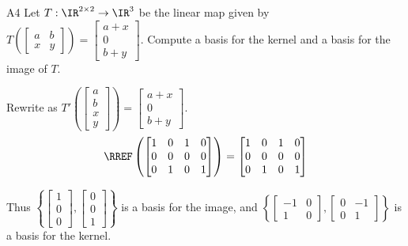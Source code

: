 \documentclass{sbgLAquiz}
\begin{document}
\begin{problem}{A4}
Let $T: \IR^{2\times 2} \rightarrow \IR^3$ be the linear map given by \(
  T\left(\begin{bmatrix} a & b \\ x & y \end{bmatrix} \right) =
  \begin{bmatrix}
    a+x \\ 0 \\ b+y
  \end{bmatrix}
\). Compute a basis for the kernel and a basis for the image of $T$.
\end{problem}
\begin{solution}
Rewrite as \(
  T'\left(\begin{bmatrix} a \\ b \\ x \\ y \end{bmatrix} \right) =
  \begin{bmatrix}
    a+x \\ 0 \\ b+y
  \end{bmatrix}
\).
\[
  \RREF \left( \begin{bmatrix}
    1 & 0 & 1 & 0 \\
    0 & 0 & 0 & 0 \\
    0 & 1 & 0 & 1
  \end{bmatrix} \right) = \begin{bmatrix}
    1 & 0 & 1 & 0 \\
    0 & 0 & 0 & 0 \\
    0 & 1 & 0 & 1
  \end{bmatrix}
\]

Thus \(\left\{
  \begin{bmatrix} 1 \\ 0 \\ 0 \end{bmatrix},
  \begin{bmatrix} 0 \\ 0 \\ 1 \end{bmatrix}
\right\} \) is a basis for the image, and \(\left\{
  \begin{bmatrix} -1 & 0 \\ 1 & 0 \end{bmatrix},
  \begin{bmatrix} 0 & -1 \\ 0 & 1 \end{bmatrix}
\right\} \) is a basis for the kernel.
\end{solution}
\end{document}
